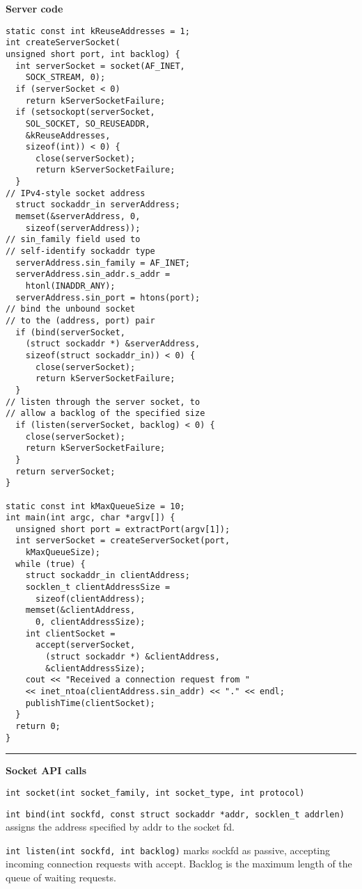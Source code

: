 \documentclass{article}
\begin{document}
\begin{multicols}{2}
  {\bf Server code}
  \begin{verbatim}
static const int kReuseAddresses = 1;
int createServerSocket(
unsigned short port, int backlog) {
  int serverSocket = socket(AF_INET,
    SOCK_STREAM, 0);
  if (serverSocket < 0)
    return kServerSocketFailure;
  if (setsockopt(serverSocket,
    SOL_SOCKET, SO_REUSEADDR,
    &kReuseAddresses,
    sizeof(int)) < 0) {
      close(serverSocket);
      return kServerSocketFailure;
  }
// IPv4-style socket address
  struct sockaddr_in serverAddress;
  memset(&serverAddress, 0,
    sizeof(serverAddress));
// sin_family field used to
// self-identify sockaddr type
  serverAddress.sin_family = AF_INET;
  serverAddress.sin_addr.s_addr =
    htonl(INADDR_ANY);
  serverAddress.sin_port = htons(port);
// bind the unbound socket
// to the (address, port) pair
  if (bind(serverSocket,
    (struct sockaddr *) &serverAddress,
    sizeof(struct sockaddr_in)) < 0) {
      close(serverSocket);
      return kServerSocketFailure;
  }
// listen through the server socket, to
// allow a backlog of the specified size
  if (listen(serverSocket, backlog) < 0) {
    close(serverSocket);
    return kServerSocketFailure;
  }
  return serverSocket;
}

static const int kMaxQueueSize = 10;
int main(int argc, char *argv[]) {
  unsigned short port = extractPort(argv[1]);
  int serverSocket = createServerSocket(port,
    kMaxQueueSize);
  while (true) {
    struct sockaddr_in clientAddress;
    socklen_t clientAddressSize =
      sizeof(clientAddress);
    memset(&clientAddress,
      0, clientAddressSize);
    int clientSocket =
      accept(serverSocket,
        (struct sockaddr *) &clientAddress,
        &clientAddressSize);
    cout << "Received a connection request from "
    << inet_ntoa(clientAddress.sin_addr) << "." << endl;
    publishTime(clientSocket);
  }
  return 0;
}
  \end{verbatim}

  \noindent\rule{4cm}{0.4pt}

  {\bf Socket API calls}

  {\tt int socket(int socket\_family, int socket\_type, int protocol)}

  {\tt int bind(int sockfd, const struct sockaddr *addr, socklen\_t addrlen)}
  assigns the address specified by addr to the socket fd.

  {\tt int listen(int sockfd, int backlog)} marks sockfd as passive, accepting
  incoming connection requests with accept. Backlog is the maximum length of the
  queue of waiting requests.


\end{multicols}
\end{document}
